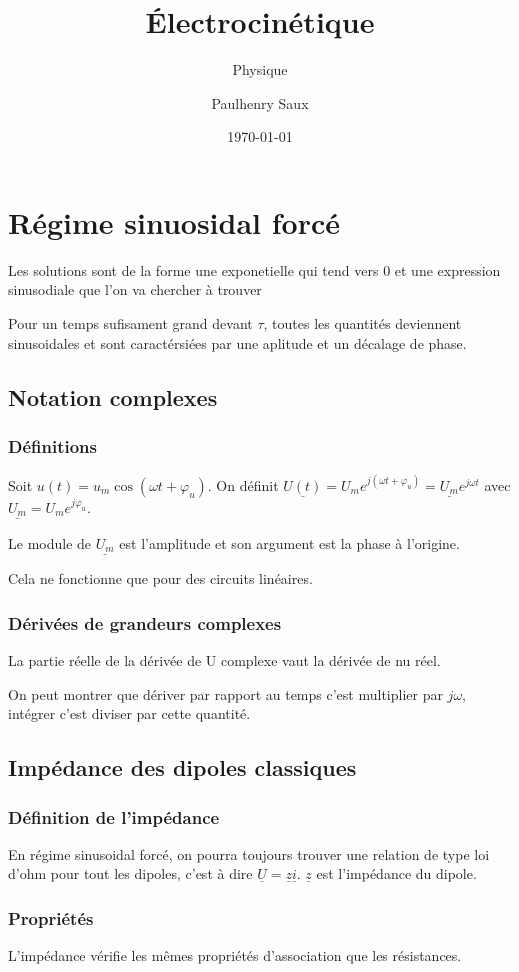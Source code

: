 \documentclass[french]{yLectureNote}
\title{Électrocinétique}
\subtitle{Physique}
\author{Paulhenry Saux}
\date{\today}
\begin{document}
\setcounter{chapter}{5}

\chapter{Régime sinuosidal forcé}
Les solutions sont de la forme  une exponetielle qui tend vers 0 et une expression sinusodiale que l'on va chercher à trouver

Pour un temps sufisament grand devant \(\tau\), toutes les quantités deviennent sinusoidales et sont caractérsiées par une aplitude et un décalage de phase.
\section{Notation complexes}
\subsection{Définitions}
Soit \(u(t) = u_m \cos(\omega t+\varphi_u)\). On définit \(\underline{U(t)} = U_m e^{j(\omega t+\varphi_u)} = \underline{U_m} e^{j\omega t}\) avec \(\underline{U_m} = U_m e^{j \varphi_u}\).

Le module de \(\underline{U_m}\) est l'amplitude et son argument est la phase à l'origine.

Cela ne fonctionne que pour des circuits linéaires.

\subsection{Dérivées de grandeurs complexes}
La partie réelle de la dérivée de U complexe vaut la dérivée de nu réel.

On peut montrer que dériver par rapport au temps c'est multiplier par \(j\omega\), intégrer c'est diviser par cette quantité.
\section{Impédance des dipoles classiques}
\subsection{Définition de l'impédance}
En régime sinusoidal forcé, on pourra toujours trouver une relation de type loi d'ohm pour tout les dipoles, c'est à dire \(\underline{U} = \underline{z}\underline{i}\). \(\underline{z}\) est l'impédance du dipole.
\subsection{Propriétés}
L'impédance vérifie les m\^emes propriétés d'association que les résistances.
\end{document}
